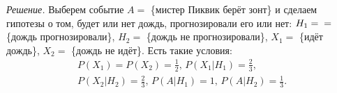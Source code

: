 \textit{Решение.}
Выберем событие $A =$ \{мистер Пиквик берёт зонт\} и сделаем гипотезы о том,
будет или нет дождь, прогнозировали его или нет: $H_1 = \\ =$ \{дождь прогнозировали\}, $H_2 =$ \{дождь не прогнозировали\}, $X_1 =$ \{идёт дождь\}, $X_2 =$ \{дождь не идёт\}.
Есть такие условия:
\begin{equation*}
\begin{split}
P \left( X_1 \right) =
P \left( X_2 \right) =
\frac{1}{2}, \,
P \left( \left. X_1 \right| H_1 \right) =
\frac{2}{3}, \\
P \left( \left. X_2 \right| H_2 \right) =
\frac{2}{3}, \,
P \left( \left. A \right| H_1 \right) =
1, \,
P \left( \left. A \right| H_2 \right) =
\frac{1}{3}.
\end{split}
\end{equation*}
